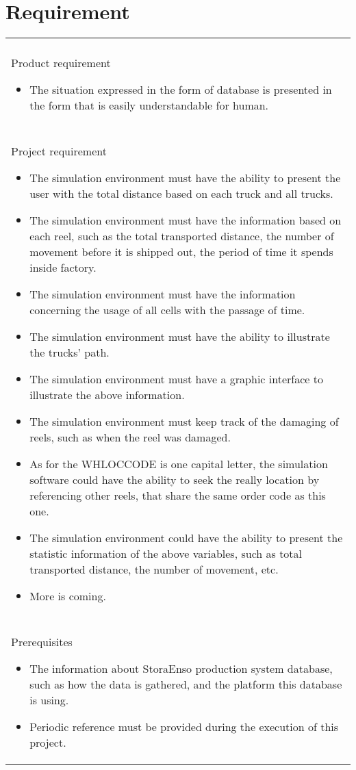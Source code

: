 \documentclass{article}
\begin{document}
\section{Requirement}
\begin{table}[h]
    \begin{tabular}{| p{14.5cm} |}
	\hline \\ [0.5ex]
	Product requirement
	\begin{itemize}
	    \item
		The situation expressed in the form of database is presented in the form that is easily understandable for human.
	\end{itemize}
	\\ [-2ex] \hline \\ [-2ex]
	Project requirement
	\begin{itemize}
	    \item
		The simulation environment must have the ability to present the user with the total distance based on each truck and all trucks.
	    \item
		The simulation environment must have the information based on each reel, such as the total transported distance, the number of
		movement before it is shipped out, the period of time it spends inside factory.
	    \item
		The simulation environment must have the information concerning the usage of all cells with the passage of time.
	    \item
		The simulation environment must have the ability to illustrate the trucks' path.
	    \item
		The simulation environment must have a graphic interface to illustrate the above information.
	    \item
		The simulation environment must keep track of the damaging of reels, such as when the reel was damaged.
	    \item
		As for the WHLOCCODE is one capital letter, the simulation software could have the ability to seek the really location by
		referencing other reels, that share the same order code as this one.
	    \item
		The simulation environment could have the ability to present the statistic information of the above variables, such as  total
		transported distance, the number of movement, etc.
	    \item
		More is coming.
	\end{itemize}
	\\ [-2ex] \hline \\ [-2ex]
	Prerequisites
	\begin{itemize}
	    \item
		The information about StoraEnso production system database, such as how the data is gathered, and the platform this database is using.
	    \item
		Periodic reference must be provided during the execution of this project.
	\end{itemize}
	\\ \hline
    \end{tabular}
\end{table}
\end{document}
